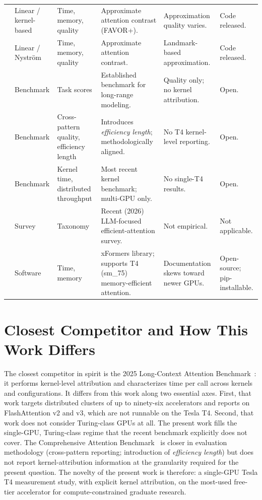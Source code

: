\documentclass[11pt]{article}
\begin{document}
\begin{small}
\begin{longtable}{p{2.4cm} p{1.6cm} p{1.6cm} p{2.5cm} p{2.2cm} p{2.5cm}}
\cite{choromanski2022rethinkingattentionperformers} & Linear / kernel-based & Time, memory, quality & Approximate attention contrast (FAVOR+). & Approximation quality varies. & Code released. \\
\cite{xiong2021nystromformernystrombasedalgorithmapproximating} & Linear / Nystr{\"o}m & Time, memory, quality & Approximate attention contrast. & Landmark-based approximation. & Code released. \\
\cite{tay2020longrangearenabenchmark} & Benchmark & Task scores & Established benchmark for long-range modeling. & Quality only; no kernel attribution. & Open. \\
\cite{zhang2025cabcomprehensiveattentionbenchmarking} & Benchmark & Cross-pattern quality, efficiency length & Introduces \textit{efficiency length}; methodologically aligned. & No T4 kernel-level reporting. & Open. \\
\cite{bu2025longcontextattentionbenchmark} & Benchmark & Kernel time, distributed throughput & Most recent kernel benchmark; multi-GPU only. & No single-T4 results. & Open. \\
\cite{sun2026efficientattentionmechanismslarge} & Survey & Taxonomy & Recent (2026) LLM-focused efficient-attention survey. & Not empirical. & Not applicable. \\
\cite{xformers2022} & Software & Time, memory & xFormers library; supports T4 (sm\_75) memory-efficient attention. & Documentation skews toward newer GPUs. & Open-source; pip-installable. \\
\end{longtable}
\end{small}

\section{Closest Competitor and How This Work Differs}

The closest competitor in spirit is the 2025 Long-Context Attention Benchmark~\parencite{bu2025longcontextattentionbenchmark}: it performs kernel-level attribution and characterizes time per call across kernels and configurations. It differs from this work along two essential axes. First, that work targets distributed clusters of up to ninety-six accelerators and reports on FlashAttention v2 and v3, which are not runnable on the Tesla T4. Second, that work does not consider Turing-class GPUs at all. The present work fills the single-GPU, Turing-class regime that the recent benchmark explicitly does not cover. The Comprehensive Attention Benchmark~\parencite{zhang2025cabcomprehensiveattentionbenchmarking} is closer in evaluation methodology (cross-pattern reporting; introduction of \textit{efficiency length}) but does not report kernel-attribution information at the granularity required for the present question. The novelty of the present work is therefore: a single-GPU Tesla T4 measurement study, with explicit kernel attribution, on the most-used free-tier accelerator for compute-constrained graduate research.
\end{document}
